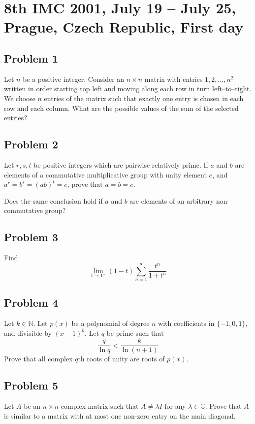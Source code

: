 \documentclass{article}
\begin{document}
\pagestyle{plain}

\section*{8th IMC 2001, July 19 -- July 25, Prague, Czech Republic, First day}

\subsection*{Problem 1}
Let \( n \) be a positive integer. Consider an \( n \times n \) matrix with entries \( 1, 2, \ldots, n^2 \) written in order starting top left and moving along each row in turn left–to–right. We choose \( n \) entries of the matrix such that exactly one entry is chosen in each row and each column. What are the possible values of the sum of the selected entries?

\subsection*{Problem 2}
Let \( r, s, t \) be positive integers which are pairwise relatively prime. If \( a \) and \( b \) are elements of a commutative multiplicative group with unity element \( e \), and \( a^r = b^s = (ab)^t = e \), prove that \( a = b = e \).

Does the same conclusion hold if \( a \) and \( b \) are elements of an arbitrary non-commutative group?

\subsection*{Problem 3}
Find
\[
\lim_{t \to 1^-} (1 - t) \sum_{n=1}^{\infty} \frac{t^n}{1 + t^n}
\]

\subsection*{Problem 4}
Let \( k \in \mathbb{N} \). Let \( p(x) \) be a polynomial of degree \( n \) with coefficients in \( \{-1, 0, 1\} \), and divisible by \( (x - 1)^k \). Let \( q \) be prime such that
\[
\frac{q}{\ln q} < \frac{k}{\ln(n+1)}
\]
Prove that all complex \( q \)th roots of unity are roots of \( p(x) \).

\subsection*{Problem 5}
Let \( A \) be an \( n \times n \) complex matrix such that \( A \ne \lambda I \)
for any \( \lambda \in \mathbb{C} \). Prove that \( A \) is similar to a matrix
with at most one non-zero entry on the main diagonal.
\end{document}
